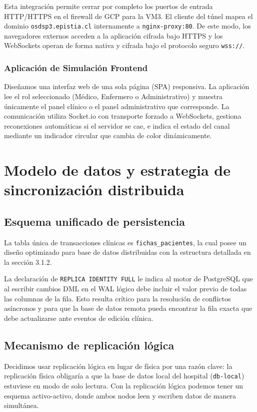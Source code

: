 \documentclass[11pt,a4paper]{article}
\begin{document}
Esta integración permite cerrar por completo los puertos de entrada HTTP/HTTPS en el firewall de GCP para la VM3. El cliente del túnel mapea el dominio \texttt{osdsp3.epistia.cl} internamente a \texttt{nginx-proxy:80}. De este modo, los navegadores externos acceden a la aplicación cifrada bajo HTTPS y los WebSockets operan de forma nativa y cifrada bajo el protocolo seguro \texttt{wss://}.

\subsubsection{Aplicación de Simulación Frontend}
Diseñamos una interfaz web de una sola página (SPA) responsiva. La aplicación lee el rol seleccionado (Médico, Enfermero o Administrativo) y muestra únicamente el panel clínico o el panel administrativo que corresponde. La comunicación utiliza Socket.io con transporte forzado a WebSockets, gestiona reconexiones automáticas si el servidor se cae, e indica el estado del canal mediante un indicador circular que cambia de color dinámicamente.

\section{Modelo de datos y estrategia de sincronización distribuida}

\subsection{Esquema unificado de persistencia}
La tabla única de transacciones clínicas es \texttt{fichas\_pacientes}, la cual posee un diseño optimizado para base de datos distribuidas con la estructura detallada en la sección 3.1.2.

La declaración de \texttt{REPLICA IDENTITY FULL} le indica al motor de PostgreSQL que al escribir cambios DML en el WAL lógico debe incluir el valor previo de todas las columnas de la fila. Esto resulta crítico para la resolución de conflictos asíncronos y para que la base de datos remota pueda encontrar la fila exacta que debe actualizarse ante eventos de edición clínica.

\subsection{Mecanismo de replicación lógica}
Decidimos usar replicación lógica en lugar de física por una razón clave: la replicación física obligaría a que la base de datos local del hospital (\texttt{db-local}) estuviese en modo de solo lectura. Con la replicación lógica podemos tener un esquema activo-activo, donde ambos nodos leen y escriben datos de manera simultánea. 
\end{document}
